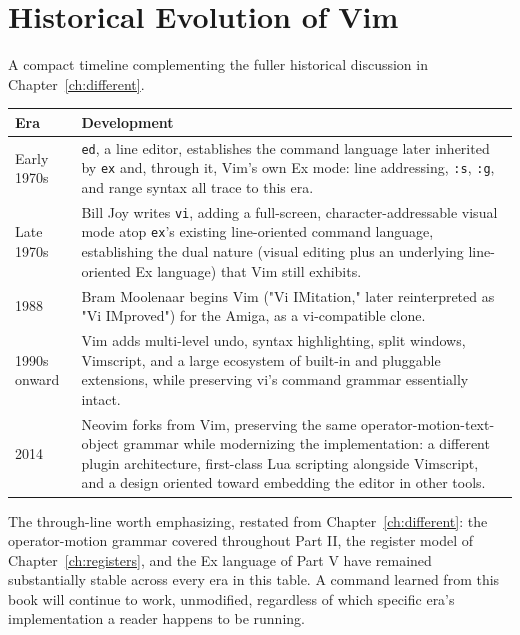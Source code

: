 \chapter{Historical Evolution of Vim}
\label{app:history}

A compact timeline complementing the fuller historical discussion in Chapter~\ref{ch:different}.

\begin{longtable}{@{}l p{9.5cm}@{}}
\textbf{Era} & \textbf{Development} \\
\hline
\endhead
Early 1970s & \texttt{ed}, a line editor, establishes the command language later inherited by \texttt{ex} and, through it, Vim's own Ex mode: line addressing, \texttt{:s}, \texttt{:g}, and range syntax all trace to this era. \\
Late 1970s & Bill Joy writes \texttt{vi}, adding a full-screen, character-addressable visual mode atop \texttt{ex}'s existing line-oriented command language, establishing the dual nature (visual editing plus an underlying line-oriented Ex language) that Vim still exhibits. \\
1988 & Bram Moolenaar begins Vim ("Vi IMitation," later reinterpreted as "Vi IMproved") for the Amiga, as a vi-compatible clone. \\
1990s onward & Vim adds multi-level undo, syntax highlighting, split windows, Vimscript, and a large ecosystem of built-in and pluggable extensions, while preserving vi's command grammar essentially intact. \\
2014 & Neovim forks from Vim, preserving the same operator-motion-text-object grammar while modernizing the implementation: a different plugin architecture, first-class Lua scripting alongside Vimscript, and a design oriented toward embedding the editor in other tools. \\
\end{longtable}

The through-line worth emphasizing, restated from Chapter~\ref{ch:different}: the operator-motion grammar covered throughout Part II, the register model of Chapter~\ref{ch:registers}, and the Ex language of Part V have remained substantially stable across every era in this table. A command learned from this book will continue to work, unmodified, regardless of which specific era's implementation a reader happens to be running.
